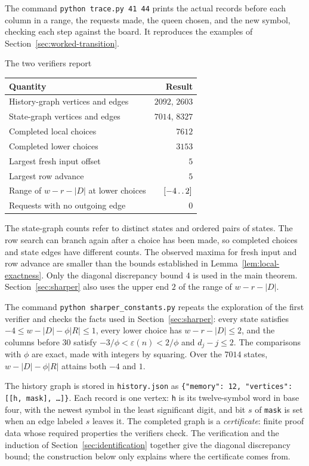 The command \texttt{python trace.py 41 44} prints the actual records
before each column in a range, the requests made, the queen chosen,
and the new symbol, checking each step against the board. It
reproduces the examples of Section~\ref{sec:worked-transition}.

The two verifiers report
\begin{center}
\begin{tabular}{lr}
\toprule
Quantity&Result\\
\midrule
History-graph vertices and edges&$2092$, $2603$\\
State-graph vertices and edges&$7014$, $8327$\\
Completed local choices&$7612$\\
Completed lower choices&$3153$\\
Largest fresh input offset&$5$\\
Largest row advance&$5$\\
Range of $w-r-|D|$ at lower choices&$[-4\mathinner{\ldotp\ldotp}2]$\\
Requests with no outgoing edge&$0$\\
\bottomrule
\end{tabular}
\end{center}
The state-graph counts refer to distinct states and ordered pairs of
states. The row search can branch again after a choice has been made,
so completed choices and state edges have different counts. The
observed maxima for fresh input and row advance are smaller than the
bounds established in Lemma~\ref{lem:local-exactness}. Only the
diagonal discrepancy bound $4$ is used in the main theorem.
Section~\ref{sec:sharper} also uses the upper end $2$
of the range of $w-r-|D|$.

The command \texttt{python sharper\_constants.py} repeats the
exploration of the first verifier and checks the facts used in
Section~\ref{sec:sharper}: every state satisfies
$-4\le w-|D|-\phi|R|\le1$, every lower choice has $w-r-|D|\le2$, and
the columns before $30$ satisfy $-3/\phi<\varepsilon(n)<2/\phi$ and
$d_j-j\le2$. The comparisons with $\phi$ are exact, made with integers
by squaring. Over the $7014$ states, $w-|D|-\phi|R|$ attains both
$-4$ and $1$.

The history graph is stored in \texttt{history.json} as
\texttt{\{"memory": 12, "vertices": [[h, mask], \ldots]\}}. Each
record is one vertex: \texttt{h} is its twelve-symbol word in base
four, with the newest symbol in the least significant digit, and bit
$s$ of \texttt{mask} is set when an edge labeled $s$ leaves it. The
completed graph is a \emph{certificate}: finite proof data whose
required properties the verifiers check. The verification and the
induction of Section~\ref{sec:identification} together give the
diagonal discrepancy bound; the construction below only explains where
the certificate comes from.

